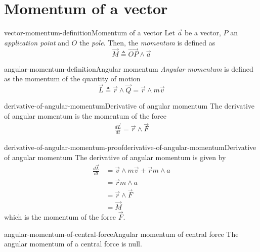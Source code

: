 \documentclass[preview]{standalone}
\begin{document}
\genpage

\section{Momentum of a vector}

\begin{snippetdefinition}{vector-momentum-definition}{Momentum of a vector}
    Let \(\vec{a}\) be a vector, \(P\) an \emph{application point}
    and \(O\) the \emph{pole}. Then, the \emph{momentum} is defined as
    \[
        \vec{M} \triangleq \vec{OP} \wedge \vec{a}
    \]
\end{snippetdefinition}

\begin{snippetdefinition}{angular-momentum-definition}{Angular momentum}
    \emph{Angular momentum} is defined as the momentum of the quantity of motion
    \[
        \vec{L} \triangleq \vec{r} \wedge \vec{Q} = \vec{r} \wedge m\vec{v}
    \]
\end{snippetdefinition}

\begin{snippetproposition}{derivative-of-angular-momentum}{Derivative of angular momentum}
    The derivative of angular momentum is the momentum of the force
    \begin{align*}
        \frac{d\vec{L}}{dt} = \vec{r} \wedge \vec{F} 
    \end{align*}
\end{snippetproposition}

\begin{snippetproof}{derivative-of-angular-momentum-proof}{derivative-of-angular-momentum}{Derivative of angular momentum}
    The derivative of angular momentum is given by
    \begin{align*}
        \frac{d\vec{L}}{dt} &= \vec{v} \wedge m\vec{v} + \vec{r} m\wedge{a} \\
        &= \vec{r} m\wedge{a} \\
        &= \vec{r} \wedge \vec{F} \\
        &= \vec{M}
    \end{align*}
    which is the momentum of the force \(\vec{F}\).
\end{snippetproof}

\begin{snippetproposition}{angular-momentum-of-central-force}{Angular momentum of central force}
    The angular momentum of a central force is null.
\end{snippetproposition}
\end{document}
